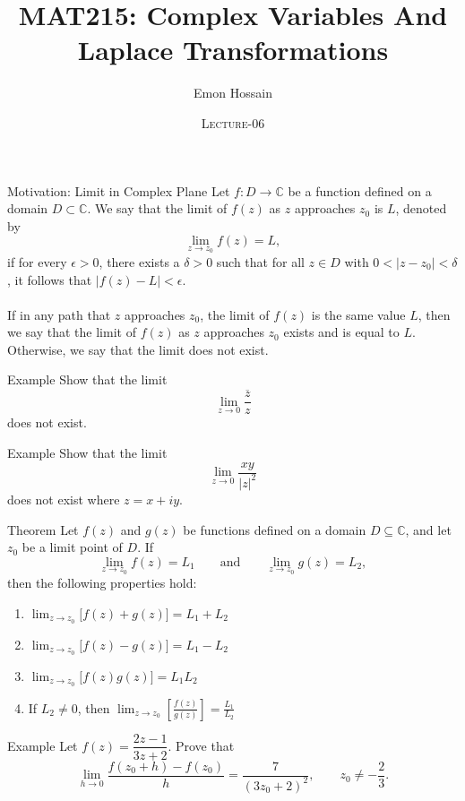 \documentclass[11pt]{beamer}
\author[] %
{Emon Hossain\inst{1}}
\institute[University of Dhaka] %
{
  \inst{1}%
  Lecturer\\MNS department\\Brac University
}
\date[] %
{\textsc{Lecture-06}}
\title[]{MAT215: Complex Variables And Laplace Transformations}
\theoremstyle{plain}
\begin{document}
\begin{frame}
\titlepage
\end{frame}


\begin{frame}{Motivation: Limit in Complex Plane}
Let $f : D \to \mathbb{C}$ be a function defined on a domain $D \subset \mathbb{C}$.
We say that the limit of $f(z)$ as $z$ approaches $z_0$ is $L$, denoted by
\[
\lim_{z\to z_0} f(z) = L,
\]
if for every $\epsilon > 0$, there exists a $\delta > 0$ such that for all $z \in D$ with
$0 < |z - z_0| < \delta$, it follows that $|f(z) - L| < \epsilon$.\\~\\
If in any path that $z$ approaches $z_0$, the limit of $f(z)$ is the same value
$L$, then we say that the limit of $f(z)$ as $z$ approaches $z_0$ exists and is
equal to $L$. Otherwise, we say that the limit does not exist.
\end{frame}
\begin{frame}{Example}
Show that the limit
\[
\lim_{z \to 0} \frac{\overline{z}}{z}
\]
does not exist.
\end{frame}
\begin{frame}{Example}
Show that the limit
\[
\lim_{z \to 0} \frac{xy}{|z|^2}
\]
does not exist where $z = x + iy$.
\end{frame}
\begin{frame}{Theorem}
    Let $f(z)$ and $g(z)$ be functions defined on a domain $D \subseteq \mathbb{C}$, and let
$z_0$ be a limit point of $D$. If
\[
\lim_{z\to z_0} f(z) = L_1
\qquad \text{and} \qquad
\lim_{z\to z_0} g(z) = L_2,
\]
then the following properties hold:
\begin{enumerate}
  \item $\displaystyle \lim_{z\to z_0}\bigl[f(z)+g(z)\bigr] = L_1 + L_2$
  \item $\displaystyle \lim_{z\to z_0}\bigl[f(z)-g(z)\bigr] = L_1 - L_2$
  \item $\displaystyle \lim_{z\to z_0}\bigl[f(z)g(z)\bigr] = L_1L_2$
  \item If $L_2 \neq 0$, then $\displaystyle \lim_{z\to z_0}\left[\frac{f(z)}{g(z)}\right] = \frac{L_1}{L_2}$
\end{enumerate}
\end{frame}

\begin{frame}{Example}
    Let $f(z)=\dfrac{2z-1}{3z+2}$. Prove that
\[
\lim_{h\to 0}\frac{f(z_0+h)-f(z_0)}{h}
=
\frac{7}{(3z_0+2)^2},
\qquad z_0\ne -\frac{2}{3}.
\]
\end{frame}
\end{document}

